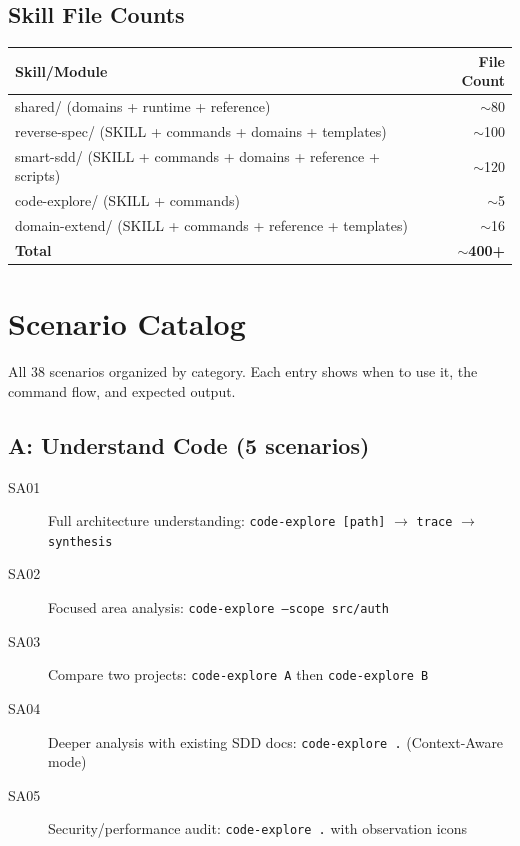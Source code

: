 \documentclass[11pt,a4paper,openright,twoside]{report}
\begin{document}
\section{Skill File Counts}

\begin{table}[H]
\centering
\begin{tabular}{lr}
\toprule
\textbf{Skill/Module} & \textbf{File Count} \\
\midrule
shared/ (domains + runtime + reference) & $\sim$80 \\
reverse-spec/ (SKILL + commands + domains + templates) & $\sim$100 \\
smart-sdd/ (SKILL + commands + domains + reference + scripts) & $\sim$120 \\
code-explore/ (SKILL + commands) & $\sim$5 \\
domain-extend/ (SKILL + commands + reference + templates) & $\sim$16 \\
\midrule
\textbf{Total} & $\sim$\textbf{400+} \\
\bottomrule
\end{tabular}
\end{table}


\chapter{Scenario Catalog}
\label{app:scenarios}

All 38 scenarios organized by category. Each entry shows when to use it, the command flow, and expected output.

\section{A: Understand Code (5 scenarios)}

\begin{description}
  \item[SA01] Full architecture understanding: \texttt{code-explore [path]} $\rightarrow$ \texttt{trace} $\rightarrow$ \texttt{synthesis}
  \item[SA02] Focused area analysis: \texttt{code-explore --scope src/auth}
  \item[SA03] Compare two projects: \texttt{code-explore A} then \texttt{code-explore B}
  \item[SA04] Deeper analysis with existing SDD docs: \texttt{code-explore .} (Context-Aware mode)
  \item[SA05] Security/performance audit: \texttt{code-explore .} with observation icons
\end{description}
\end{document}

